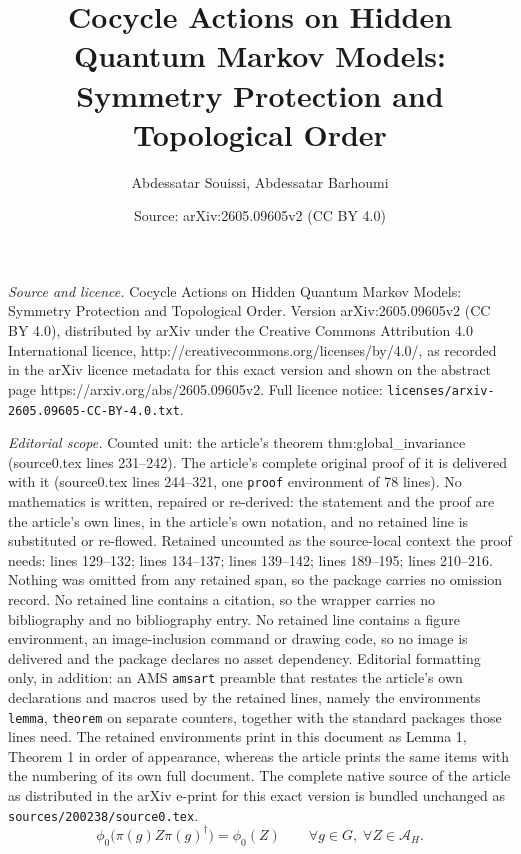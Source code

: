 \documentclass[10pt,a4paper]{amsart}
\title{Cocycle Actions on Hidden Quantum Markov Models: Symmetry Protection and Topological Order}
\author{Abdessatar Souissi, Abdessatar Barhoumi}
\date{Source: arXiv:2605.09605v2 (CC BY 4.0)}
\begin{document}
\maketitle

\noindent\emph{Source and licence.} Cocycle Actions on Hidden Quantum Markov Models: Symmetry Protection and Topological Order. Version arXiv:2605.09605v2 (CC BY 4.0), distributed by arXiv under the Creative Commons Attribution 4.0 International licence, http://creativecommons.org/licenses/by/4.0/, as recorded in the arXiv licence metadata for this exact version and shown on the abstract page https://arxiv.org/abs/2605.09605v2. Full licence notice: \texttt{licenses/arxiv-2605.09605-CC-BY-4.0.txt}.\par\smallskip

\noindent\textit{Editorial scope.} Counted unit: the article's theorem thm:global\_invariance (source0.tex lines 231--242). The article's complete original proof of it is delivered with it (source0.tex lines 244--321, one \texttt{proof} environment of 78 lines). No mathematics is written, repaired or re-derived: the statement and the proof are the article's own lines, in the article's own notation, and no retained line is substituted or re-flowed.  Retained uncounted as the source-local context the proof needs: lines 129--132; lines 134--137; lines 139--142; lines 189--195; lines 210--216.  Nothing was omitted from any retained span, so the package carries no omission record.  No retained line contains a citation, so the wrapper carries no bibliography and no bibliography entry.  No retained line contains a figure environment, an image-inclusion command or drawing code, so no image is delivered and the package declares no asset dependency.  Editorial formatting only, in addition: an AMS \texttt{amsart} preamble that restates the article's own declarations and macros used by the retained lines, namely the environments \texttt{lemma}, \texttt{theorem} on separate counters, together with the standard packages those lines need.  The retained environments print in this document as Lemma 1, Theorem 1 in order of appearance, whereas the article prints the same items with the numbering of its own full document.  The complete native source of the article as distributed in the arXiv e-print for this exact version is bundled unchanged as \texttt{sources/200238/source0.tex}.
\begin{equation}
\phi_0\bigl( \pi(g) Z \pi(g)^\dagger \bigr) = \phi_0(Z) \qquad \forall g \in G,\; \forall Z \in \mathcal{A}_H.
\label{eq:initial_invariance}
\end{equation}
\end{document}
